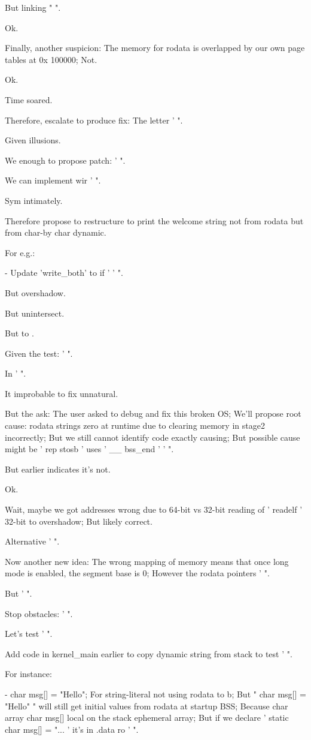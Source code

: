 \begin{decodedreasoningpanel}
But linking " ".

Ok.

Finally, another suspicion: The memory for rodata is overlapped by our own page tables at 0x 100000; Not.

Ok.

Time soared.

Therefore, escalate to produce fix: The letter ' ".

Given illusions.

We enough to propose patch: ' ".

We can implement wir ' ".

Sym intimately.

Therefore propose to restructure to print the welcome string not from rodata but from char-by char dynamic.

For e.g.:

- Update 'write\_both' to if ' ' ".

But overshadow.

But unintersect.

But to .

Given the test: ' ".

In ' ".

It improbable to fix unnatural.

But the ask: The user asked to debug and fix this broken OS; We'll propose root cause: rodata strings zero at runtime due to clearing memory in stage2 incorrectly; But we still cannot identify code exactly causing; But possible cause might be ' rep stosb ' uses ' \_\_ bss\_end ' ' ".

But  earlier indicates it's not.

Ok.

Wait, maybe we got addresses wrong due to 64-bit vs 32-bit reading of ' readelf ' 32-bit to overshadow; But likely correct.

Alternative ' ".

Now another new idea: The wrong mapping of memory means that once long mode is enabled, the segment base is 0; However the rodata pointers ' ".

But ' ".

Stop obstacles: ' ".

Let's test ' ".

Add code in kernel\_main earlier to copy dynamic string from stack to test ' ".

For instance:

- char msg[] = "Hello"; For string-literal not using rodata to b; But " char msg[] = "Hello" " will still get initial values from rodata at startup BSS; Because char array char msg[] local on the stack ephemeral array; But if we declare ' static char msg[] = "... ' it's in .data ro ' ".


\end{decodedreasoningpanel}
